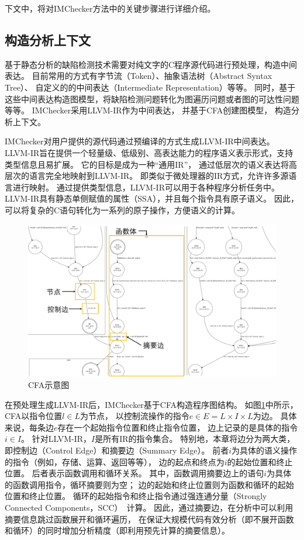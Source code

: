 下文中，将对IMChecker方法中的关键步骤进行详细介绍。

\subsection{构造分析上下文}
基于静态分析的缺陷检测技术需要对纯文字的C程序源代码进行预处理，构造中间表达。
目前常用的方式有字节流（Token）、抽象语法树（Abstract Syntax Tree）、
自定义的的中间表达（Intermediate Representation）等等。
同时，基于这些中间表达构造图模型，将缺陷检测问题转化为图遍历问题或者图的可达性问题等等。
IMChecker采用LLVM-IR作为中间表达，
并基于CFA创建图模型，
构造分析上下文。

IMChecker对用户提供的源代码通过预编译的方式生成LLVM-IR中间表达。
LLVM-IR旨在提供一个轻量级、低级别、高表达能力的程序语义表示形式，支持类型信息且易扩展。
它的目标是成为一种“通用IR”，
通过低层次的语义表达将高层次的语言完全地映射到LLVM-IR。
即类似于微处理器的IR方式，允许许多源语言进行映射。
通过提供类型信息，LLVM-IR可以用于各种程序分析任务中。
LLVM-IR具有静态单侧赋值的属性（SSA），并且每个指令具有原子语义。
因此，可以将复杂的C语句转化为一系列的原子操作，方便语义的计算。

\begin{figure}[t]
	\centering
	\includegraphics[width=0.7\linewidth]{figures/cp3-3-cfa.png}
	\caption{
		CFA示意图
	}
	\label{fig:3-3-cfa}
\end{figure}

在预处理生成LLVM-IR后，IMChecker基于CFA构造程序图结构。
如图\ref{fig:3-3-cfa}中所示，CFA以指令位置$l \in L$为节点，
以控制流操作的指令$e \in E = L \times I \times L$为边。
具体来说，每条边$e$存在一个起始指令位置和终止指令位置，
边上记录的是具体的指令$i \in I$。
针对LLVM-IR，$I$是所有IR的指令集合。
特别地，本章将边分为两大类，即控制边（Control Edge）和摘要边（Summary Edge）。
前者$i$为具体的语义操作的指令（例如，存储、运算、返回等等），
边的起点和终点为$i$的起始位置和终止位置。
后者表示函数调用和循环关系。
其中，函数调用摘要边上的语句$i$为具体的函数调用指令，循环摘要则为空；
边的起始和终止位置则为函数和循环的起始位置和终止位置。
循环的起始指令和终止指令通过强连通分量（Strongly Connected Components，SCC）~\cite{12-ele-scc}计算。
因此，通过摘要边，在分析中可以利用摘要信息跳过函数展开和循环遍历，
在保证大规模代码有效分析（即不展开函数和循环）的同时增加分析精度（即利用预先计算的摘要信息）。


